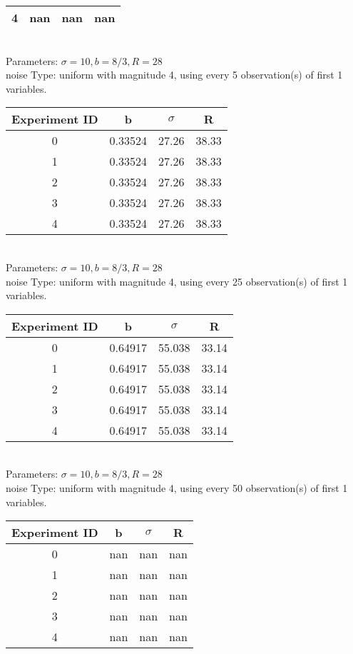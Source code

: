 \begin{multicols}{3}
\begin{tabular}{cccc}
 4 & nan & nan & nan\\ \hline 
 \end{tabular}\\
Parameters: $\sigma=10, b=8/3, R=28$\\
noise Type: uniform with magnitude 4, using every 5 observation(s) of first 1 variables.\\
\begin{tabular}{cccc}
\hline Experiment ID & b & $\sigma$ & R \\ \hline 
0 & 0.33524 & 27.26 & 38.33\\ \hline 
 1 & 0.33524 & 27.26 & 38.33\\ \hline 
 2 & 0.33524 & 27.26 & 38.33\\ \hline 
 3 & 0.33524 & 27.26 & 38.33\\ \hline 
 4 & 0.33524 & 27.26 & 38.33\\ \hline 
 \end{tabular}\\
Parameters: $\sigma=10, b=8/3, R=28$\\
noise Type: uniform with magnitude 4, using every 25 observation(s) of first 1 variables.\\
\begin{tabular}{cccc}
\hline Experiment ID & b & $\sigma$ & R \\ \hline 
0 & 0.64917 & 55.038 & 33.14\\ \hline 
 1 & 0.64917 & 55.038 & 33.14\\ \hline 
 2 & 0.64917 & 55.038 & 33.14\\ \hline 
 3 & 0.64917 & 55.038 & 33.14\\ \hline 
 4 & 0.64917 & 55.038 & 33.14\\ \hline 
 \end{tabular}\\
Parameters: $\sigma=10, b=8/3, R=28$\\
noise Type: uniform with magnitude 4, using every 50 observation(s) of first 1 variables.\\
\begin{tabular}{cccc}
\hline Experiment ID & b & $\sigma$ & R \\ \hline 
0 & nan & nan & nan\\ \hline 
 1 & nan & nan & nan\\ \hline 
 2 & nan & nan & nan\\ \hline 
 3 & nan & nan & nan\\ \hline 
 4 & nan & nan & nan\\ \hline 

\end{tabular}
\end{multicols}
